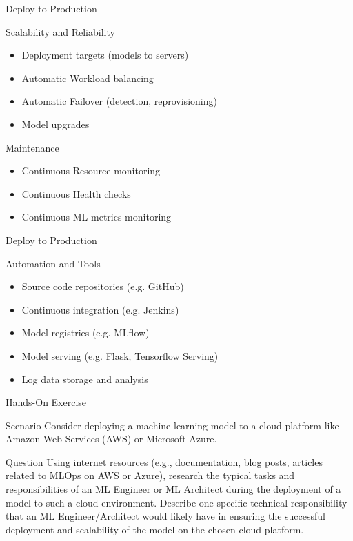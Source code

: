 \documentclass[ignorenonframetext,xcolor=x11names]{beamer}
\begin{document}
\begin{frame}{Deploy to Production}
\begin{block}{Scalability and Reliability} 
\begin{itemize}
   \item Deployment targets (models to servers)
   \item Automatic Workload balancing
   \item Automatic Failover (detection, reprovisioning)
   \item Model upgrades
\end{itemize}
\end{block}
\begin{block}{Maintenance}
\begin{itemize}
   \item Continuous Resource monitoring
   \item Continuous Health checks
   \item Continuous ML metrics monitoring
\end{itemize}
\end{block}
\end{frame}

\begin{frame}{Deploy to Production}
\begin{block}{Automation and Tools}
\begin{itemize}
   \item Source code repositories (e.g. GitHub)
   \item Continuous integration (e.g. Jenkins)
   \item Model registries (e.g. MLflow)
   \item Model serving (e.g. Flask, Tensorflow Serving) 
   \item Log data storage and analysis
\end{itemize}
\end{block}
\end{frame}

\begin{frame}{Hands-On Exercise}

\begin{block}{Scenario}
Consider deploying a machine learning model to a cloud platform like Amazon Web Services (AWS) or Microsoft Azure.
\end{block}

\begin{block}{Question}
Using internet resources (e.g., documentation, blog posts, articles related to MLOps on AWS or Azure), research the typical tasks and responsibilities of an ML Engineer or ML Architect during the deployment of a model to such a cloud environment. Describe one specific technical responsibility that an ML Engineer/Architect would likely have in ensuring the successful deployment and scalability of the model on the chosen cloud platform.
\end{block}
\end{frame}
\end{document}
